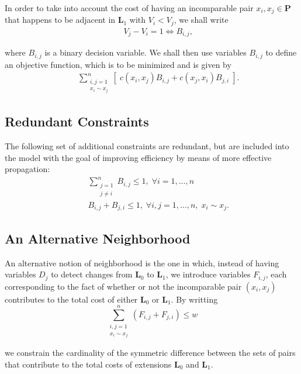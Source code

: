 \documentclass{llncs}
\begin{document}
In order to take into account the cost of having an incomparable pair $x_i, x_j \in \mathbf P$ that happens to be adjacent in $\mathbf{L}_1$ with $V_i < V_j$, we shall write
\begin{eqnarray}
&& V_j - V_i = 1 \Leftrightarrow B_{i,j},
\end{eqnarray}

\noindent where $B_{i,j}$ is a binary decision variable. We shall then use variables $B_{i,j}$ to define an objective function, which is to be minimized and is given by
\begin{eqnarray}
&& \sum_{\substack{i,j=1 \\ x_i \sim x_j}}^n \left[ \; c(x_i,x_j) B_{i,j} + c(x_j,x_i) B_{j,i} \; \right].
\end{eqnarray}

\subsection{Redundant Constraints}

The following set of additional constraints are redundant, but are included into the model with the goal of improving efficiency by means of more effective propagation:
\begin{eqnarray}
&& \sum_{\substack{j=1 \\ j \neq i}}^n B_{i,j} \leq 1, \; \forall i=1,\ldots,n\\
&& B_{i,j} + B_{j,i} \leq 1, \; \forall i,j=1,\ldots,n, \; x_i \sim x_j.
\end{eqnarray}

\subsection{An Alternative Neighborhood}

An alternative notion of neighborhood is the one in which, instead of having variables $D_j$ to detect changes from $\mathbf{L}_0$ to $\mathbf{L}_1$, we introduce variables $F_{i,j}$, each corresponding to the fact of whether or not the incomparable pair $(x_i,x_j)$ contributes to the total cost of either $\mathbf{L}_0$ or $\mathbf{L}_1$. By writting
\begin{equation}
\sum_{\substack{i,j=1 \\ x_i \sim x_j}}^n \left( F_{i,j} + F_{j,i} \right) \leq w
\end{equation}

\noindent we constrain the cardinality of the symmetric difference between the sets of pairs that contribute to the total costs of extensions $\mathbf{L}_0$ and $\mathbf{L}_1$.
\end{document}
